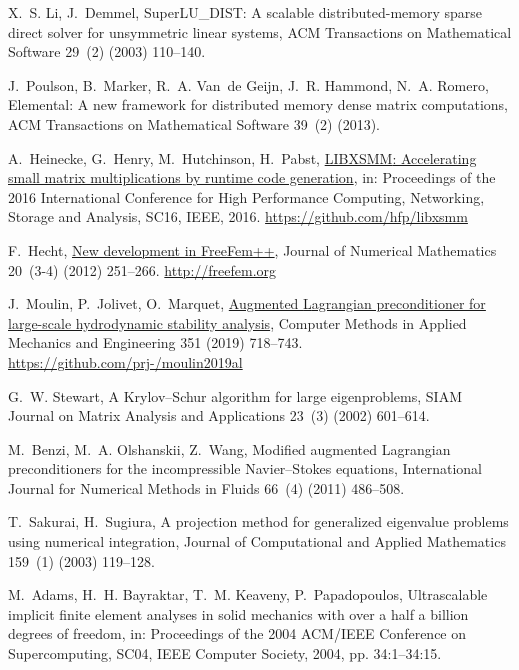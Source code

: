 \documentclass[3p,11pt]{elsarticle}
\begin{document}
\begin{thebibliography}{10}
X.~S. Li, J.~Demmel, {S}uper{LU\_DIST}: A scalable distributed-memory sparse
  direct solver for unsymmetric linear systems, ACM Transactions on
  Mathematical Software 29~(2) (2003) 110--140.

J.~Poulson, B.~Marker, R.~A. Van~de Geijn, J.~R. Hammond, N.~A. Romero,
  Elemental: A new framework for distributed memory dense matrix computations,
  ACM Transactions on Mathematical Software 39~(2) (2013).

A.~Heinecke, G.~Henry, M.~Hutchinson, H.~Pabst,
  \href{https://github.com/hfp/libxsmm}{{LIBXSMM}: Accelerating small matrix
  multiplications by runtime code generation}, in: Proceedings of the 2016
  International Conference for High Performance Computing, Networking, Storage
  and Analysis, SC16, IEEE, 2016.
\newline\urlprefix\url{https://github.com/hfp/libxsmm}

F.~Hecht, \href{http://freefem.org}{New development in {FreeFem++}}, Journal of
  Numerical Mathematics 20~(3-4) (2012) 251--266.
\newline\urlprefix\url{http://freefem.org}

J.~Moulin, P.~Jolivet, O.~Marquet,
  \href{https://github.com/prj-/moulin2019al}{Augmented {L}agrangian
  preconditioner for large-scale hydrodynamic stability analysis}, Computer
  Methods in Applied Mechanics and Engineering 351 (2019) 718--743.
\newline\urlprefix\url{https://github.com/prj-/moulin2019al}

G.~W. Stewart, A {K}rylov--{S}chur algorithm for large eigenproblems, SIAM
  Journal on Matrix Analysis and Applications 23~(3) (2002) 601--614.

M.~Benzi, M.~A. Olshanskii, Z.~Wang, Modified augmented {L}agrangian
  preconditioners for the incompressible {N}avier--{S}tokes equations,
  International Journal for Numerical Methods in Fluids 66~(4) (2011) 486--508.

T.~Sakurai, H.~Sugiura, A projection method for generalized eigenvalue problems
  using numerical integration, Journal of Computational and Applied Mathematics
  159~(1) (2003) 119--128.

M.~Adams, H.~H. Bayraktar, T.~M. Keaveny, P.~Papadopoulos, Ultrascalable
  implicit finite element analyses in solid mechanics with over a half a
  billion degrees of freedom, in: Proceedings of the 2004 ACM/IEEE Conference
  on Supercomputing, SC04, IEEE Computer Society, 2004, pp. \mbox{34:1--34:15}.


\end{thebibliography}
\end{document}
